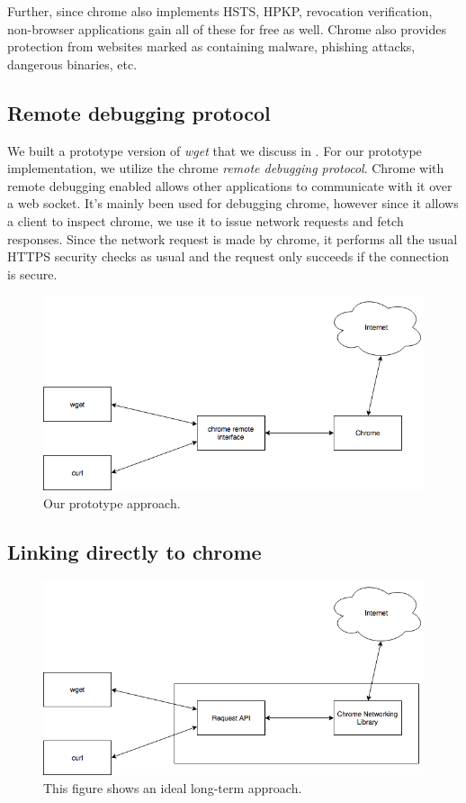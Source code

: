 Further, since chrome also implements HSTS, HPKP, revocation verification, non-browser
applications gain all of these for free as well. Chrome also provides protection
from websites marked as containing malware, phishing attacks, dangerous binaries, etc.

\subsection{Remote debugging protocol}
We built a prototype version of \emph{wget} that we discuss in
. For our prototype implementation, we utilize the chrome
\emph{remote debugging protocol}. Chrome with remote debugging enabled allows
other applications to communicate with it over a web socket. It's mainly been
used for debugging chrome, however since it allows a client to inspect chrome,
we use it to issue network requests and fetch responses. Since the network request
is made by chrome, it performs all the usual HTTPS security checks as usual and
the request only succeeds if the connection is secure.

\begin{figure}[h]
  \includegraphics[width=\textwidth]{figures/prototype}
  \caption[Prototype saber approach]{Our prototype approach.} 
  \label{fig:prototype-saber}
\end{figure}

\subsection{Linking directly to chrome}


\begin{figure}[h]
  \includegraphics[width=\textwidth]{figures/long-term}
  \caption[Long-term saber approach]{This figure shows an ideal long-term
  approach.} 
  \label{fig:long-term-saber}
\end{figure}


